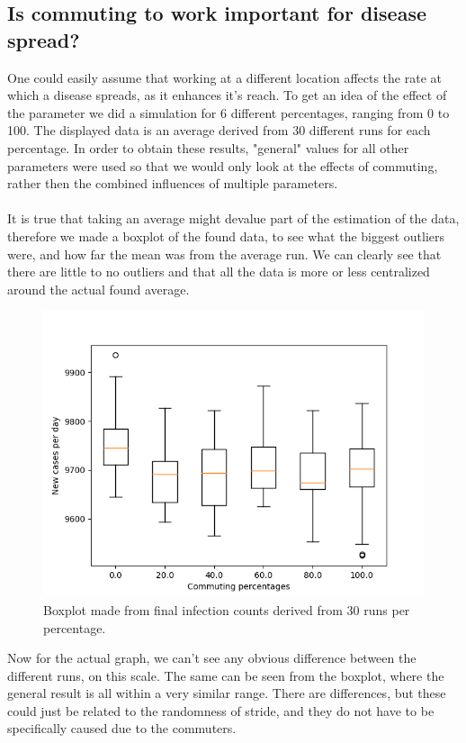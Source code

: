 \documentclass[runningheads]{llncs}
\begin{document}
	\subsection{Is commuting to work important for disease spread?}
	One could easily assume that working at a different location affects the rate at which a disease spreads, as it enhances it's reach. To get an idea of the effect of the parameter we did a simulation for 6 different percentages, ranging from 0 to 100. The displayed data is an average derived from 30 different runs for each percentage. In order to obtain these results, "general" values for all other parameters were used so that we would only look at the effects of commuting, rather then the combined influences of multiple parameters. \\
	\\
	\noindent 
	It is true that taking an average might devalue part of the estimation of the data, therefore we made a boxplot of the found data, to see what the biggest outliers were, and how far the mean was from the average run. We can clearly see that there are little to no outliers and that all the data is more or less centralized around the actual found average.
	\begin{figure}
		\includegraphics[width=\textwidth]{commuting_boxplot.png}
		\caption{Boxplot made from final infection counts derived from 30 runs per percentage.}
	\end{figure}
	
	\noindent
	Now for the actual graph, we can't see any obvious difference between the different runs, on this scale. The same can be seen from the boxplot, where the general result is all within a very similar range. There are differences, but these could just be related to the randomness of stride, and they do not have to be specifically caused due to the commuters. 
	
\end{document}
